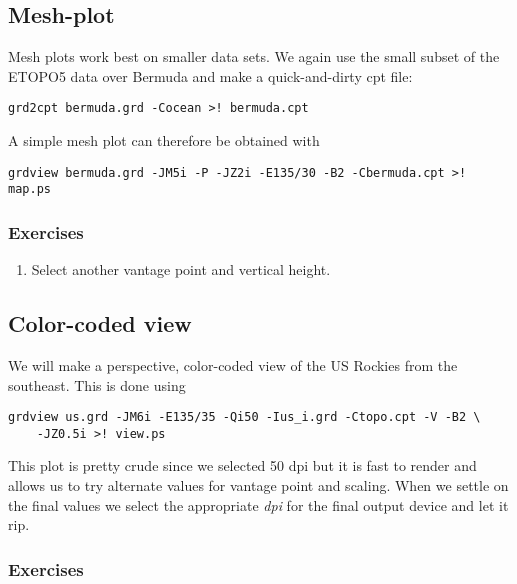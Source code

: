 \documentclass{report}
\begin{document}
\subsection{Mesh-plot}

Mesh plots work best on smaller data sets.  We again use the small
subset of the ETOPO5 data over Bermuda and make a quick-and-dirty
cpt file:

\begin{verbatim}
grd2cpt bermuda.grd -Cocean >! bermuda.cpt
\end{verbatim}

A simple mesh plot can therefore be obtained with

\begin{verbatim}
grdview bermuda.grd -JM5i -P -JZ2i -E135/30 -B2 -Cbermuda.cpt >! map.ps
\end{verbatim}


\subsubsection{Exercises}

\begin{enumerate}

\item Select another vantage point and vertical height.

\end{enumerate}

\subsection{Color-coded view}

We will make a perspective, color-coded view of the US Rockies
from the southeast.  This is done using

\begin{verbatim}
grdview us.grd -JM6i -E135/35 -Qi50 -Ius_i.grd -Ctopo.cpt -V -B2 \
    -JZ0.5i >! view.ps
\end{verbatim}

\noindent
This plot is pretty crude since we selected 50 dpi but it is fast
to render and allows us to try alternate values for vantage point
and scaling.  When we settle on the final values we select the
appropriate {\it dpi} for the final output device and let it rip.

\subsubsection{Exercises}
\end{document}
